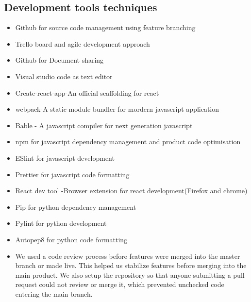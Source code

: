 \documentclass[a4paper,10pt]{article}
\begin{document}
\subsection{Development tools techniques}
\begin{itemize}
\item  Github for source code management using feature branching
\item Trello board and agile development approach
\item Github for Document sharing
\item Visual studio code as text editor
\item Create-react-app-An official scaffolding for react
\item webpack-A static module bundler for mordern javascript application
\item Bable - A javascript compiler for next generation javascript
\item npm for javascript dependency management and product code optimisation
\item ESlint for javascript development
\item Prettier for javascript code formatting
\item React dev tool -Browser extension for react development(Firefox and chrome)
\item Pip for python dependency management
\item Pylint for python development
\item Autopep8 for python code formatting
\item We used a code review process before features were merged into the master branch or made live. This helped us stabilize features before merging into the main product. We also setup the repository so that anyone submitting a pull request could not review or merge it, which prevented unchecked code entering the main branch.
\end{itemize}


\newpage
\end{document}
